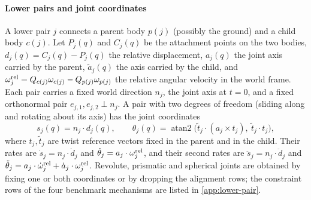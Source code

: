 \paragraph{Lower pairs and joint coordinates}
A lower pair $j$ connects a parent body $p(j)$ (possibly the ground) and a child body $c(j)$. Let
$P_j(q)$ and $C_j(q)$ be the attachment points on the two bodies, $d_j(q)=C_j(q)-P_j(q)$ the
relative displacement, $a_j(q)$ the joint axis carried by the parent, $\tilde a_j(q)$ the axis
carried by the child, and $\omega^{\rm rel}_j=Q_{c(j)}\omega_{c(j)}-Q_{p(j)}\omega_{p(j)}$ the
relative angular velocity in the world frame. Each pair carries a fixed world direction $n_j$, the
joint axis at $t=0$, and a fixed orthonormal pair $e_{j,1},e_{j,2}\perp n_j$. A pair with two
degrees of freedom (sliding along and rotating about its axis) has the joint coordinates
\begin{equation}
  s_j(q)=n_j\cdot d_j(q),\qquad
  \theta_j(q)=\operatorname{atan2}\bigl(\tilde t_j\cdot(a_j\times t_j),\ \tilde t_j\cdot t_j\bigr),
  \label{eq:joint-coordinates}
\end{equation}
where $t_j,\tilde t_j$ are twist reference vectors fixed in the parent and in the child. Their
rates are $\dot s_j=n_j\cdot\dot d_j$ and $\dot\theta_j=a_j\cdot\omega^{\rm rel}_j$, and their
second rates are $\ddot s_j=n_j\cdot\ddot d_j$ and
$\ddot\theta_j=a_j\cdot\dot\omega^{\rm rel}_j+\dot a_j\cdot\omega^{\rm rel}_j$. Revolute,
prismatic and spherical joints are obtained by fixing one or both coordinates or by dropping the
alignment rows; the constraint rows of the four benchmark mechanisms are listed in
\ref{app:lower-pair}.

